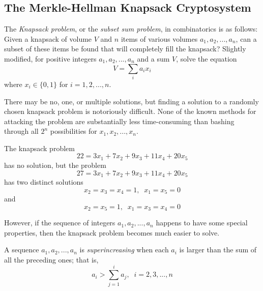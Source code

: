 \documentclass{article}
\newcounter{definition}[section]
\newcounter{example}[section]
\begin{document}
\subsection{The Merkle-Hellman Knapsack Cryptosystem}
The \textit{Knapsack problem}, or the \textit{subset sum problem}, in combinatorics is as follows: Given a knapsack of volume $V$ and $n$ items of various volumes $a_1, a_2, ..., a_n$, can a subset of these items be found that will completely fill the knapsack? Slightly modified, for positive integers $a_1, a_2, ..., a_n$ and a sum $V$, solve the equation
\begin{equation}
  V = \sum_{i} a_i x_i
\end{equation}
where $x_i \in \{0, 1\}$ for $i = 1, 2, ..., n$. 

There may be no, one, or multiple solutions, but finding a solution to a randomly chosen knapsack problem is notoriously difficult. None of the known methods for attacking the problem are substantially less time-consuming than bashing through all $2^n$ possibilities for $x_1, x_2, ..., x_n$. 

\begin{example}
  \label{ex:solvable-and-unsolvable-knapsack-problems}
The knapsack problem 
\begin{equation}
  22 = 3x_1 + 7x_2 + 9x_3 + 11x_4 + 20x_5
\end{equation}
has no solution, but the problem 
\begin{equation}
  27 = 3x_1 + 7x_2 + 9x_3 + 11x_4 + 20x_5
\end{equation}
has two distinct solutions 
\begin{equation}
  x_2 = x_3 = x_4 = 1, \;\; x_1 = x_5 = 0
\end{equation}
and 
\begin{equation}
  x_2 = x_5 = 1, \;\; x_1 = x_3 = x_4 = 0
\end{equation}
\end{example}

However, if the sequence of integers $a_1, a_2, ..., a_n$ happens to have some special properties, then the knapsack problem becomes much easier to solve. 

\begin{definition}
  \label{def:superincreasing-sequence}
A sequence $a_1, a_2, ..., a_n$ is \textit{superincreasing} when each $a_i$ is larger than the sum of all the preceding ones; that is, 
\begin{equation}
  a_i > \sum_{j=1}^i a_j, \;\; i = 2, 3, ..., n
\end{equation}
\end{definition}
\end{document}
